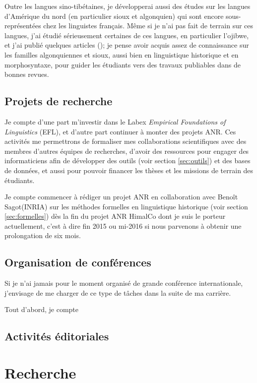 \documentclass[oldfontcommands,oneside,a4paper,11pt]{article}
\begin{document}
Outre les langues sino-tibétaines, je développerai aussi des études sur les langues d'Amérique du nord (en particulier sioux et algonquien) qui sont encore sous-représentées chez les linguistes français. Même si je n'ai pas fait de terrain sur ces langues, j'ai étudié sérieusement certaines de ces langues, en particulier l'ojibwe, et j'ai publié quelques articles (\citealt{jacques13arapaho}); je pense avoir acquis assez de connaissance sur les familles algonquiennes et sioux, aussi bien en linguistique historique et en morphosyntaxe, pour guider les étudiants vers des travaux publiables dans de bonnes revues.

\subsection{Projets de recherche}
Je compte d'une part m'investir dans le Labex \textit{Empirical Foundations of Linguistics} (EFL), et d'autre part continuer à monter des projets ANR. Ces activités me permettrons de formaliser mes collaborations scientifiques avec des membres d'autres équipes de recherches, d'avoir des ressources pour engager des informaticiens afin de développer des outils (voir section \ref{sec:outils}) et des bases de données, et aussi pour pouvoir financer les thèses et les missions de terrain des étudiants.

Je compte commencer à rédiger un projet ANR en collaboration avec Benoît Sagot(INRIA) sur les méthodes formelles en linguistique historique (voir section \ref{sec:formelles}) dès la fin du projet ANR HimalCo dont je suis le porteur actuellement, c'est à dire fin 2015 ou mi-2016 si nous parvenons à obtenir une prolongation de six mois.

\subsection{Organisation de conférences}
Si je n'ai jamais pour le moment organisé de grande conférence internationale, j'envisage de me charger de ce type de tâches dans la suite de ma carrière.

Tout d'abord, je compte 

\subsection{Activités éditoriales}


\section{Recherche}
\end{document}
